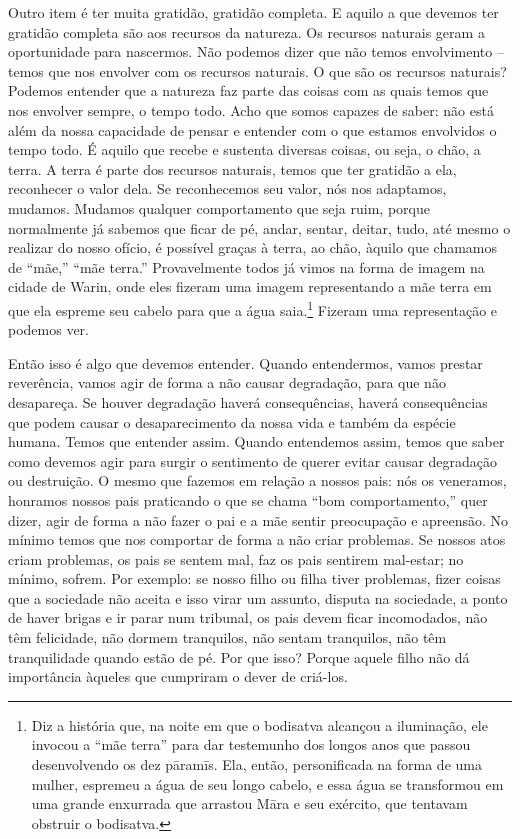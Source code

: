 Outro item é ter muita gratidão, gratidão completa. E aquilo a que
devemos ter gratidão completa são aos recursos da natureza. Os recursos
naturais geram a oportunidade para nascermos. Não podemos dizer que não
temos envolvimento – temos que nos envolver com os recursos naturais. O
que são os recursos naturais? Podemos entender que a natureza faz parte
das coisas com as quais temos que nos envolver sempre, o tempo todo.
Acho que somos capazes de saber: não está além da nossa capacidade de
pensar e entender com o que estamos envolvidos o tempo todo. É aquilo
que recebe e sustenta diversas coisas, ou seja, o chão, a terra. A
terra é parte dos recursos naturais, temos que ter gratidão a ela,
reconhecer o valor dela. Se reconhecemos seu valor, nós nos adaptamos,
mudamos. Mudamos qualquer comportamento que seja ruim, porque
normalmente já sabemos que ficar de pé, andar, sentar, deitar, tudo,
até mesmo o realizar do nosso ofício, é possível graças à terra, ao
chão, àquilo que chamamos de “mãe,” “mãe terra.” Provavelmente todos já
vimos na forma de imagem na cidade de Warin, onde eles fizeram uma
imagem representando a mãe terra em que ela espreme seu cabelo para que
a água saia.\footnote{Diz a história que, na noite em que o bodisatva
alcançou a iluminação, ele invocou a “mãe terra” para dar testemunho
dos longos anos que passou desenvolvendo os dez pāramīs. Ela,
então, personificada na forma de uma mulher, espremeu a água de seu
longo cabelo, e essa água se transformou em uma grande enxurrada que
arrastou Māra e seu exército, que tentavam obstruir o bodisatva.}
Fizeram uma representação e podemos ver. 

Então isso é algo que devemos entender. Quando entendermos, vamos
prestar reverência, vamos agir de forma a não causar degradação, para
que não desapareça. Se houver degradação haverá consequências, haverá
consequências que podem causar o desaparecimento da nossa vida e também
da espécie humana. Temos que entender assim. Quando entendemos assim,
temos que saber como devemos agir para surgir o sentimento de querer
evitar causar degradação ou destruição. O mesmo que fazemos em relação
a nossos pais: nós os veneramos, honramos nossos pais praticando o que
se chama “bom comportamento,” quer dizer, agir de forma a não fazer o
pai e a mãe sentir preocupação e apreensão. No mínimo temos que nos
comportar de forma a não criar problemas. Se nossos atos criam
problemas, os pais se sentem mal, faz os pais sentirem mal-estar; no
mínimo, sofrem. Por exemplo: se nosso filho ou filha tiver problemas,
fizer coisas que a sociedade não aceita e isso virar um assunto,
disputa na sociedade, a ponto de haver brigas e ir parar num tribunal,
os pais devem ficar incomodados, não têm felicidade, não dormem
tranquilos, não sentam tranquilos, não têm tranquilidade quando estão
de pé. Por que isso? Porque aquele filho não dá importância àqueles que
cumpriram o dever de criá-los. 

